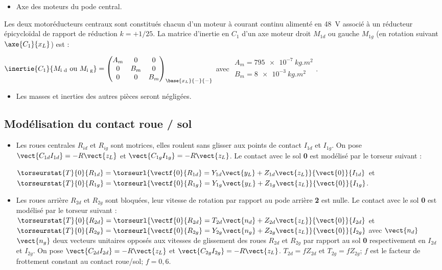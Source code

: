 \begin{itemize}
\item Axe des moteurs du pode central.
\end{itemize}

Les deux motoréducteurs centraux sont constitués chacun d’un moteur à courant continu alimenté en \SI{48}{V} associé à
un réducteur épicycloïdal de rapport de réduction $k = +1/ 25$. La matrice d’inertie en $C_1$ d’un axe moteur droit $M_{1d}$ ou
gauche $M_{1g}$  (en rotation suivant $\axe{C_1}{x_L}$) est :

$\inertie{C_1}{M_{\text{i d}} \text{ ou } M_{\text{i g}}}=
\begin{pmatrix} 
A_m & 0 & 0 \\ 0 & B_m & 0 \\ 0 & 0 & B_m 
\end{pmatrix}_{\base{x_L}{-}{-}}$
avec 
$\begin{array}{l}
A_m =\SI{795e-7}{kg.m^2} \\
B_m =\SI{8e-3}{kg.m^2} \\
\end{array}$.

\begin{itemize}
\item Les masses et inerties des autres pièces seront négligées.
\end{itemize}
\fi
\subsection*{Modélisation du contact roue / sol}
\ifprof
\else

\begin{itemize}
\item Les roues centrales $R_{id}$ et $R_{ig}$ sont motrices, elles roulent sans glisser aux points de contact $I_{1d}$ et $I_{1g}$. On pose $\vect{C_{1d}I_{1d}}=-R\vect{z_L}$ et $\vect{C_{1g}I_{1g}}=-R\vect{z_L}$. Le contact avec le sol \textbf{0} est modélisé par le torseur suivant :

$\torseurstat{T}{0}{R_{1d}}=\torseurl{\vectf{0}{R_{1d}}=Y_{1d}\vect{y_L}+Z_{1d}\vect{z_L}}{\vect{0}}{I_{1d}}$
et
$\torseurstat{T}{0}{R_{1g}}=\torseurl{\vectf{0}{R_{1g}}=Y_{1g}\vect{y_L}+Z_{1g}\vect{z_L}}{\vect{0}}{I_{1g}}$.

\item Les roues arrière $R_{2d}$ et $R_{2g}$ sont bloquées, leur vitesse de rotation par rapport au pode arrière \textbf{2} est nulle. Le contact avec le sol \textbf{0} est modélisé par le torseur suivant : 
$\torseurstat{T}{0}{R_{2d}}=\torseurl{\vectf{0}{R_{2d}}=T_{2d}\vect{n_d}+Z_{2d}\vect{z_L}}{\vect{0}}{I_{2d}}$
et
$\torseurstat{T}{0}{R_{2g}}=\torseurl{\vectf{0}{R_{2g}}=Y_{2g}\vect{n_g}+Z_{2g}\vect{z_L}}{\vect{0}}{I_{2g}}$
avec $\vect{n_d}$ $\vect{n_g}$ deux vecteurs unitaires opposés aux vitesses de glissement des roues $R_{2d}$ et $R_{2g}$ par rapport au sol \textbf{0}
respectivement en $I_{2d}$ et $I_{2g}$. On pose $\vect{C_{2d}I_{2d}}=-R\vect{z_L}$ et 
$\vect{C_{2g}I_{2g}}=-R\vect{z_L}$. $T_{2d}=fZ_{2d}$ et $T_{2g}=fZ_{2g}$; $f$ est le facteur de frottement constant au contact roue/sol; $f = 0,6$.
\end{itemize}
\fi

